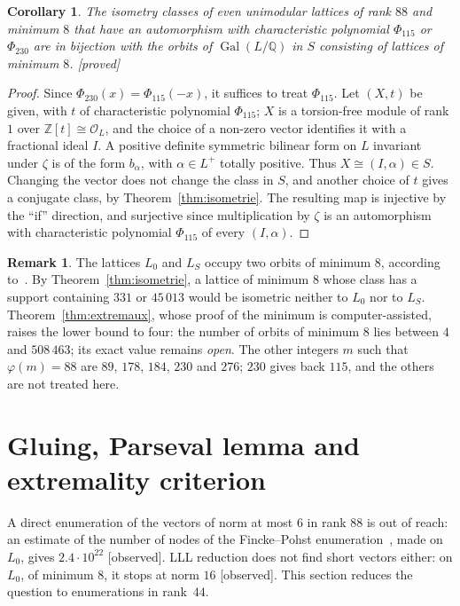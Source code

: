 \documentclass[11pt,a4paper]{amsart}
\theoremstyle{plain}
\newtheorem{corollary}[theorem]{Corollary}
\theoremstyle{definition}
\newtheorem{remark}[theorem]{Remark}
\numberwithin{equation}{section}
\newcommand{\Q}{\mathbb{Q}}
\newcommand{\Z}{\mathbb{Z}}
\newcommand{\OO}{\mathcal{O}}
\DeclareMathOperator{\Gal}{Gal}
\newcommand{\Lz}{L_{0}}
\newcommand{\LS}{L_{S}}
\newcommand{\st}[1]{\textup{\textsf{\small[#1]}}}
\newcommand{\DEM}{\st{proved}}
\newcommand{\CONS}{\st{observed}}
\begin{document}
\begin{corollary}\label{cor:bijection}
The isometry classes of even unimodular lattices of rank $88$ and minimum $8$ that have an automorphism with characteristic polynomial $\Phi_{115}$ or $\Phi_{230}$ are in bijection with the orbits of $\Gal(L/\Q)$ in $S$ consisting of lattices of minimum $8$. \DEM
\end{corollary}

\begin{proof}
Since $\Phi_{230}(x)=\Phi_{115}(-x)$, it suffices to treat $\Phi_{115}$. Let $(X,t)$ be given, with $t$ of characteristic polynomial $\Phi_{115}$; $X$ is a torsion-free module of rank $1$ over $\Z[t]\cong\OO_L$, and the choice of a non-zero vector identifies it with a fractional ideal $I$. A positive definite symmetric bilinear form on $L$ invariant under $\zeta$ is of the form $b_\alpha$, with $\alpha\in L^+$ totally positive. Thus $X\cong(I,\alpha)\in S$. Changing the vector does not change the class in $S$, and another choice of $t$ gives a conjugate class, by Theorem~\ref{thm:isometrie}. The resulting map is injective by the ``if'' direction, and surjective since multiplication by $\zeta$ is an automorphism with characteristic polynomial $\Phi_{115}$ of every $(I,\alpha)$.
\end{proof}

\begin{remark}\label{rem:autresorbites}
The lattices $\Lz$ and $\LS$ occupy two orbits of minimum $8$, according to~\cite{Sak26}. By Theorem~\ref{thm:isometrie}, a lattice of minimum $8$ whose class has a support containing $331$ or $45\,013$ would be isometric neither to $\Lz$ nor to $\LS$. Theorem~\ref{thm:extremaux}, whose proof of the minimum is computer-assisted, raises the lower bound to four: the number of orbits of minimum $8$ lies between $4$ and $508\,463$; its exact value remains \emph{open}. The other integers $m$ such that $\varphi(m)=88$ are $89$, $178$, $184$, $230$ and $276$; $230$ gives back $115$, and the others are not treated here.
\end{remark}

\section{Gluing, Parseval lemma and extremality criterion}\label{sec:recollement}

A direct enumeration of the vectors of norm at most $6$ in rank $88$ is out of reach: an estimate of the number of nodes of the Fincke--Pohst enumeration~\cite{FP85}, made on $\Lz$, gives $2.4\cdot10^{22}$ \CONS. LLL reduction does not find short vectors either: on $\Lz$, of minimum $8$, it stops at norm $16$ \CONS. This section reduces the question to enumerations in rank~$44$.
\end{document}
